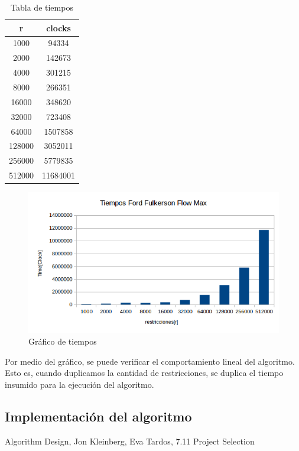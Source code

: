 \begin{table}[H]
\centering
\begin{tabular}{|c|c|}
\hline
r 	& clocks       \\ \hline
1000    & 94334        \\ \hline
2000    & 142673       \\ \hline
4000    & 301215       \\ \hline
8000    & 266351       \\ \hline
16000   & 348620       \\ \hline
32000   & 723408       \\ \hline
64000   & 1507858      \\ \hline
128000  & 3052011      \\ \hline
256000  & 5779835      \\ \hline
512000  & 11684001     \\ \hline
\end{tabular}
\caption{Tabla de tiempos}
\end{table}

\begin{figure}[H]
\centering
\includegraphics[width=\textwidth]{FlujoDeRedes/tiempos.png}
\caption{Gráfico de tiempos}
\end{figure}

Por medio del gráfico, se puede verificar el comportamiento lineal del algoritmo.
Esto es, cuando duplicamos la cantidad de restricciones, se duplica el tiempo insumido para la ejecución del algoritmo.

\newpage

\subsection{Implementación del algoritmo}



\renewcommand\refname{Referencias}
\begin{thebibliography}{X}
 Algorithm Design, Jon Kleinberg, Eva Tardos, 7.11 Project Selection
\end{thebibliography}
\newpage

